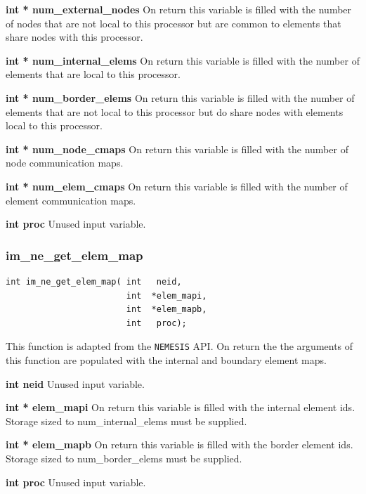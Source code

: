 {\setlength{\parindent}{0pt}
 \textbf{int * num\_external\_nodes} On return this variable is filled with the number of nodes that are not local to this processor but are common to elements that share nodes with this processor.}

{\setlength{\parindent}{0pt}
 \textbf{int * num\_internal\_elems} On return this variable is filled with the number of elements that are local to this processor.}

{\setlength{\parindent}{0pt}
 \textbf{int * num\_border\_elems} On return this variable is filled with the number of elements that are not local to this processor but do share nodes with elements local to this processor.}

{\setlength{\parindent}{0pt}
 \textbf{int * num\_node\_cmaps} On return this variable is filled with the number of node communication maps.}

{\setlength{\parindent}{0pt}
 \textbf{int * num\_elem\_cmaps} On return this variable is filled with the number of element communication maps.}

{\setlength{\parindent}{0pt}
 \textbf{int proc} Unused input variable.}


\subsubsection{im\_ne\_get\_elem\_map}
{\ttfamily  \begin{verbatim}
int im_ne_get_elem_map( int   neid,
                        int  *elem_mapi,
                        int  *elem_mapb,
                        int   proc);
\end{verbatim}}

This function is adapted from the \texttt{NEMESIS} API. On return the the arguments of this function are populated with the internal and boundary element maps.

{\setlength{\parindent}{0pt}
 \textbf{int neid} Unused input variable.}

{\setlength{\parindent}{0pt}
 \textbf{int * elem\_mapi} On return this variable is filled with the internal element ids. Storage sized to num\_internal\_elems must be supplied.}

{\setlength{\parindent}{0pt}
 \textbf{int * elem\_mapb} On return this variable is filled with the border element ids. Storage sized to num\_border\_elems must be supplied. }

{\setlength{\parindent}{0pt}
 \textbf{int proc} Unused input variable.}


